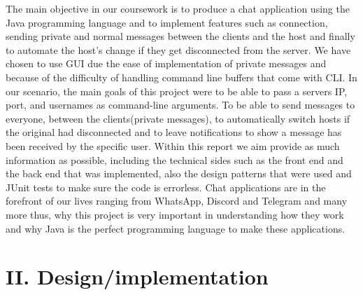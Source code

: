 \documentclass{COMPXXXX}
\begin{document}
\normalsize \textrm {The main objective in our coursework is to produce a chat application using the Java programming language and to implement features such as connection, sending private and normal messages between the clients and the host and finally to automate the host’s change if they get disconnected from the server. We have chosen to use GUI due the ease of implementation of private messages and because of the difficulty of handling command line buffers that come with CLI. In our scenario, the main goals of this project were to be able to pass a servers IP, port, and usernames as command-line arguments. To be able to send messages to everyone, between the clients(private messages), to automatically switch hosts if the original had disconnected and to leave notifications to show a message has been received by the specific user. Within this report we aim provide as much information as possible, including the technical sides such as the front end and the back end that was implemented, also the design patterns that were used and JUnit tests to make sure the code is errorless. Chat applications are in the forefront of our lives ranging from WhatsApp, Discord and Telegram and many more thus, why this project is very important in understanding how they work and why Java is the perfect programming language to make these applications.}

\section{II. Design/implementation}
\end{document}
